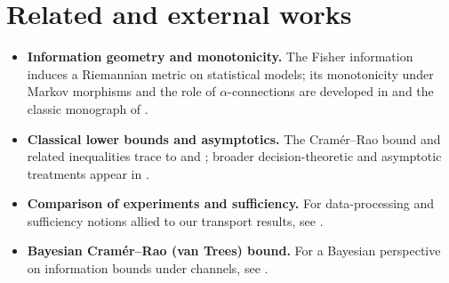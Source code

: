 \documentclass[11pt]{article}
\begin{document}
\section*{Related and external works}
\begin{itemize}[leftmargin=2em]
\item \textbf{Information geometry and monotonicity.} The Fisher information induces a Riemannian metric on statistical models; its monotonicity under Markov morphisms and the role of $\alpha$-connections are developed in \textcite{AmariNagaoka2000} and the classic monograph of \textcite{Cencov1981}.
\item \textbf{Classical lower bounds and asymptotics.} The Cram\'er--Rao bound and related inequalities trace to \textcite{Cramer1946} and \textcite{Rao1945}; broader decision-theoretic and asymptotic treatments appear in \textcite{LeCam1986}.
\item \textbf{Comparison of experiments and sufficiency.} For data-processing and sufficiency notions allied to our transport results, see \textcite{Blackwell1951}.
\item \textbf{Bayesian Cram\'er--Rao (van Trees) bound.} For a Bayesian perspective on information bounds under channels, see \textcite{VanTrees1968}.
\end{itemize}

\printbibliography
\end{document}
